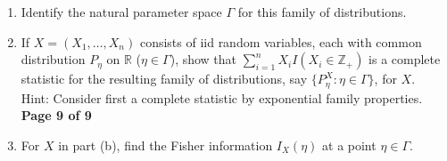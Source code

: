 \documentclass[12pt]{article}
\begin{document}
\begin{enumerate}
\begin{enumerate}
\item Identify the natural parameter space $\Gamma$  for this family of distributions.\\[4in]


\item If $X=(X_1,\ldots,X_n)$ consists of iid random variables, each with common distribution $P_\eta$ on $ \mathbb{R}$ ($\eta \in \Gamma$), show that $\sum_{i=1}^n X_i I(X_i \in \mathbb{Z}_+)$ is a complete statistic for the resulting family of distributions, say $\{P^X_\eta: \eta \in \Gamma\}$, for $X$.\\[.1cm]
Hint: Consider first a complete statistic by exponential family properties.
\newpage
\textbf{\hspace*{1cm} \hfill Page 9 of 9}

\item For $X$ in part (b), find the Fisher information $I_X(\eta)$ at a point $\eta \in \Gamma$.



\end{enumerate}


\end{enumerate}
\end{document}
